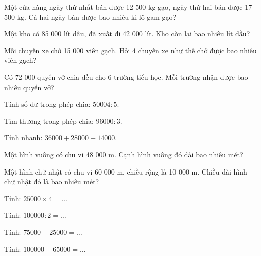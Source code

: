 \begin{ex}
Một cửa hàng ngày thứ nhất bán được 12 500 kg gạo, ngày thứ hai bán được 17 500 kg. Cả hai ngày bán được bao nhiêu ki-lô-gam gạo?
\end{ex}

\begin{ex}
Một kho có 85 000 lít dầu, đã xuất đi 42 000 lít. Kho còn lại bao nhiêu lít dầu?
\end{ex}

\begin{ex}
Mỗi chuyến xe chở 15 000 viên gạch. Hỏi 4 chuyến xe như thế chở được bao nhiêu viên gạch?
\end{ex}

\begin{ex}
Có 72 000 quyển vở chia đều cho 6 trường tiểu học. Mỗi trường nhận được bao nhiêu quyển vở?
\end{ex}

\begin{ex}
Tính số dư trong phép chia: $50004 : 5$.
\end{ex}

\begin{ex}
Tìm thương trong phép chia: $96000 : 3$.
\end{ex}

\begin{ex}
Tính nhanh: $36000 + 28000 + 14000$.
\end{ex}

\begin{ex}
Một hình vuông có chu vi 48 000 m. Cạnh hình vuông đó dài bao nhiêu mét?
\end{ex}

\begin{ex}
Một hình chữ nhật có chu vi 60 000 m, chiều rộng là 10 000 m. Chiều dài hình chữ nhật đó là bao nhiêu mét?
\end{ex}

\begin{ex}
Tính: $25000 \times 4 = \dots$
\end{ex}

\begin{ex}
Tính: $100000 : 2 = \dots$
\end{ex}

\begin{ex}
Tính: $75000 + 25000 = \dots$
\end{ex}

\begin{ex}
Tính: $100000 - 65000 = \dots$
\end{ex}
